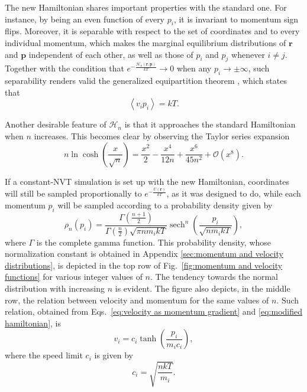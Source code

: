 \documentclass[
aip,
jcp,
reprint,
]{revtex4-1}
\DeclareMathOperator\sech{sech}
\newcommand{\vt}[1]{\boldsymbol{\mathbf{#1}}}          %
\newcommand{\nn}{n}
\begin{document}
The new Hamiltonian shares important properties with the standard one.
For instance, by being an even function of every $p_i$, it is invariant to momentum sign flips.
Moreover, it is separable with respect to the set of coordinates and to every individual momentum, which makes the marginal equilibrium distributions of $\vt r$ and $\vt p$ independent of each other, as well as those of $p_i$ and $p_j$ whenever $i \neq j$.
Together with the condition that $e^{-\frac{\mathcal{H}_\nn(\vt r, \vt p)}{k T}} \to 0$ when any $p_i \to \pm \infty$, such separability renders valid  \cite{Uline_2008} the generalized equipartition theorem \cite{Tolman_1918a}, which states that
\begin{equation}
\label{eq:generalized equipartition}
\left\langle v_i p_i \right\rangle = k T.
\end{equation}

Another desirable feature of $\mathcal{H}_\nn$ is that it approaches the standard Hamiltonian when $\nn$ increases.
This becomes clear by observing the Taylor series expansion
\begin{equation*}
\nn \ln \cosh\left(\frac{x}{\sqrt{\nn}}\right) = \frac{x^2}{2} - \frac{x^4}{12 \nn} + \frac{x^6}{45 \nn^2} + \mathcal{O}(x^8).
\end{equation*}

If a constant-NVT simulation is set up with the new Hamiltonian, coordinates will still be sampled proportionally to $e^{-\frac{U(\vt r)}{kT}}$, as it was designed to do, while each momentum $p_i$ will be sampled according to a probability density given by
\begin{equation}
\label{eq:momentum distribution}
\rho_\nn(p_i) = \frac{\Gamma\left(\frac{\nn+1}{2}\right)}{\Gamma\left(\frac{\nn}{2}\right) \sqrt{\pi \nn m_i k T}} \sech^\nn\left(\frac{p_i}{\sqrt{\nn m_i k T}}\right),
\end{equation}
where $\Gamma$ is the complete gamma function.
This probability density, whose normalization constant is obtained in Appendix \ref{sec:momentum and velocity distributions}, is depicted in the top row of Fig.~\ref{fig:momentum and velocity functions} for various integer values of $\nn$.
The tendency towards the normal distribution with increasing $\nn$ is evident.
The figure also depicts, in the middle row, the relation between velocity and momentum for the same values of $\nn$.
Such relation, obtained from Eqs.~\eqref{eq:velocity as momentum gradient} and \eqref{eq:modified hamiltonian}, is
\begin{equation}
	\label{eq:velocity definition}
	v_i = c_i \tanh\left(\frac{p_i}{m_i c_i}\right),
\end{equation}
	where the speed limit $c_i$ is given by
\begin{equation}
	\label{eq:speed limit definition}
	c_i = \sqrt{\frac{\nn k T}{m_i}}.
\end{equation}
\end{document}
